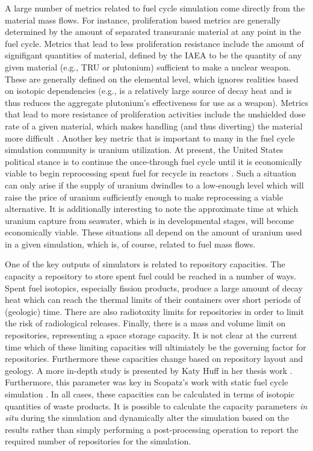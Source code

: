 A large number of metrics related to fuel cycle simulation come directly from
the material mass flows. For instance, proliferation based metrics are generally
determined by the amount of separated transuranic material at any point in the
fuel cycle. Metrics that lead to less proliferation resistance include the
amount of signifigant quantities of material, defined by the IAEA to be the
quantity of any given material (e.g., TRU or plutonium) sufficient to make a
nuclear weapon. These are generally defined on the elemental level, which
ignores realities based on isotopic dependencies (e.g.,  is a
relatively large source of decay heat and is thus reduces the aggregate
plutonium's effectiveness for use as a weapon). Metrics that lead to more
resistance of proliferation activities include the unshielded dose rate of a
given material, which makes handling (and thus diverting) the material more
difficult \cite{yacout_vision_2006}. Another key metric that is important to
many in the fuel cycle simulation community is uranium utilization. At present,
the United States political stance is to continue the once-through fuel cycle
until it is economically viable to begin reprocessing spent fuel for recycle in
reactors \cite{hamilton_blue_2012}. Such a situation can only arise if the
supply of uranium dwindles to a low-enough level which will raise the price of
uranium sufficiently enough to make reprocessing a viable alternative. It is
additionally interesting to note the approximate time at which uranium capture
from seawater, which is in developmental stages, will become economically
viable. These situations all depend on the amount of uranium used in a given
simulation, which is, of course, related to fuel mass flows.

One of the key outputs of simulators is related to repository capacities. The
capacity a repository to store spent fuel could be reached in a number of
ways. Spent fuel isotopics, especially fission products, produce a large amount
of decay heat which can reach the thermal limits of their containers over short
periods of (geologic) time. There are also radiotoxity limits for repositories
in order to limit the risk of radiological releases. Finally, there is a mass
and volume limit on repositories, representing a space storage capacity. It is
not clear at the current time which of these limiting capacities will
ultimiately be the governing factor for repositories. Furthermore these
capacities change based on repository layout and geology. A more in-depth study
is presented by Katy Huff in her thesis work
\cite{huff_integrated_2013}. Furthermore, this parameter was key in Scopatz's
work with static fuel cycle simulation \cite{scopatz_essential_2011}. In all
cases, these capacities can be calculated in terms of isotopic quantities of
waste products. It is possible to calculate the capacity parameters \textit{in
  situ} during the simulation and dynamically alter the simulation based on the
results rather than simply performing a post-processing operation to report the
required number of repositories for the simulation. 
